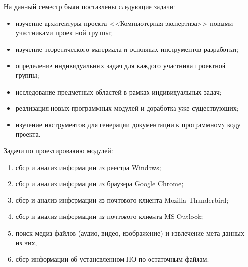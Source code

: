 На данный семестр были поставлены следующие задачи:

\begin{itemize}
\item изучение архитектуры проекта <<Компьютерная экспертиза>> новыми участниками проектной группы;
\item изучение теоретического материала и основных инструментов разработки;
\item определение индивидуальных задач для каждого участника проектной группы;
\item исследование предметных областей в рамках индивидуальных задач; 
\item реализация новых программных модулей и доработка уже существующих;
\item изучение инструментов для генерации документации к программному коду проекта.
\end{itemize}

Задачи по проектированию модулей:

\begin{enumerate}
\item сбор и анализ информации из реестра Windows;
\item сбор и анализ информации из браузера Google Chrome;
\item сбор и анализ информации из почтового клиента Mozilla Thunderbird;
\item сбор и анализ информации из почтового клиента MS Outlook;
\item поиск медиа-файлов (аудио, видео, изображение) и извлечение мета-данных из них;
\item сбор информации об установленном ПО по остаточным файлам.
\end{enumerate}
